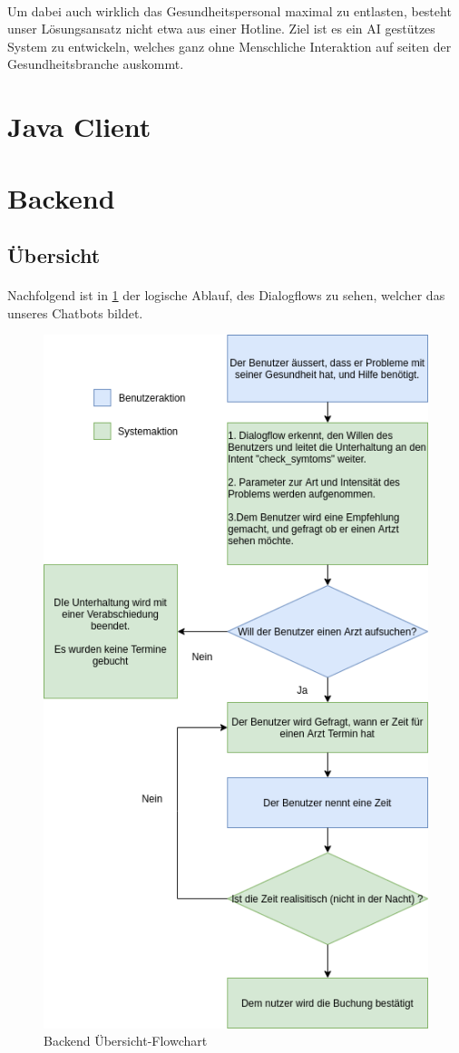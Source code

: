 \documentclass[11pt, letterpaper]{article}
\begin{document}
        \paragraph{}
            Um dabei auch wirklich das Gesundheitspersonal maximal zu entlasten, besteht unser
            Lösungsansatz nicht etwa aus einer Hotline. Ziel ist es ein AI gestützes System zu entwickeln,
            welches ganz ohne Menschliche Interaktion auf seiten der Gesundheitsbranche auskommt.


\newpage

\section{Java Client}

\newpage

\section{Backend}

    \subsection{Übersicht}
        \paragraph{}
        Nachfolgend ist in \ref{fig:backEndFlowChart} der logische Ablauf, des Dialogflows zu sehen, welcher das
        unseres Chatbots bildet.
        \begin{figure}[h!]
            \begin{center}
                \includegraphics[width=0.6\linewidth]{ressources/backendOverview.png}
            \end{center}
            \caption{Backend Übersicht-Flowchart}
            \label{fig:backEndFlowChart}
        \end{figure}
        \newpage
\end{document}
